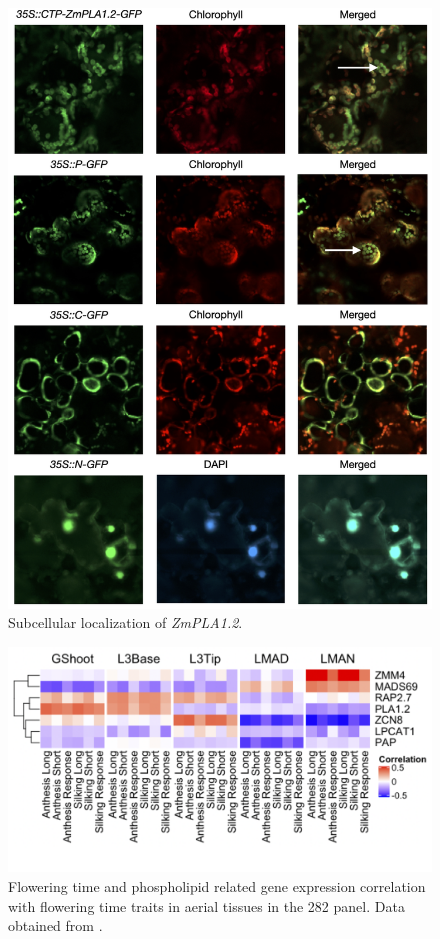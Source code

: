 \documentclass[9pt,twocolumn,twoside,lineno]{BioRxiv}
\begin{document}
\begin{figure}[t]
\begin{center}
\includegraphics[width=0.4\paperwidth]{Sup_Figures/Sup_Fig_7.png}
\caption{Subcellular localization of \textit{ZmPLA1.2}.
}
\label{SupFig7}
\end{center}
\end{figure} 

\clearpage

\begin{figure}[t]
\begin{center}
\includegraphics[width=0.4\paperwidth]{Sup_Figures/Sup_Fig_8.png}
\caption{Flowering time and phospholipid related gene expression correlation with flowering time traits in aerial tissues in the 282 panel. 
Data obtained from \cite{Kremling2018-gn}.
}
\label{SupFig8}
\end{center}
\end{figure} 
\end{document}
